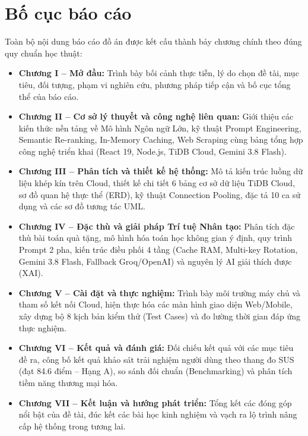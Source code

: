 
\section{Bố cục báo cáo}

Toàn bộ nội dung báo cáo đồ án được kết cấu thành bảy chương chính theo đúng quy chuẩn học thuật:

\begin{itemize}[leftmargin=1.2cm, itemsep=3pt]
    \item \textbf{Chương I -- Mở đầu:} Trình bày bối cảnh thực tiễn, lý do chọn đề tài, mục tiêu, đối tượng, phạm vi nghiên cứu, phương pháp tiếp cận và bố cục tổng thể của báo cáo.
    \item \textbf{Chương II -- Cơ sở lý thuyết và công nghệ liên quan:} Giới thiệu các kiến thức nền tảng về Mô hình Ngôn ngữ Lớn, kỹ thuật Prompt Engineering, Semantic Re-ranking, In-Memory Caching, Web Scraping cùng bảng tổng hợp công nghệ triển khai (React 19, Node.js, TiDB Cloud, Gemini 3.8 Flash).
    \item \textbf{Chương III -- Phân tích và thiết kế hệ thống:} Mô tả kiến trúc luồng dữ liệu khép kín trên Cloud, thiết kế chi tiết 6 bảng cơ sở dữ liệu TiDB Cloud, sơ đồ quan hệ thực thể (ERD), kỹ thuật Connection Pooling, đặc tả 10 ca sử dụng và các sơ đồ tương tác UML.
    \item \textbf{Chương IV -- Đặc thù và giải pháp Trí tuệ Nhân tạo:} Phân tích đặc thù bài toán quà tặng, mô hình hóa toán học không gian ý định, quy trình Prompt 2 pha, kiến trúc điều phối 4 tầng (Cache RAM, Multi-key Rotation, Gemini 3.8 Flash, Fallback Groq/OpenAI) và nguyên lý AI giải thích được (XAI).
    \item \textbf{Chương V -- Cài đặt và thực nghiệm:} Trình bày môi trường máy chủ và tham số kết nối Cloud, hiện thực hóa các màn hình giao diện Web/Mobile, xây dựng bộ 8 kịch bản kiểm thử (Test Cases) và đo lường thời gian đáp ứng thực nghiệm.
    \item \textbf{Chương VI -- Kết quả và đánh giá:} Đối chiếu kết quả với các mục tiêu đề ra, công bố kết quả khảo sát trải nghiệm người dùng theo thang đo SUS (đạt 84.6 điểm -- Hạng A), so sánh đối chuẩn (Benchmarking) và phân tích tiềm năng thương mại hóa.
    \item \textbf{Chương VII -- Kết luận và hướng phát triển:} Tổng kết các đóng góp nổi bật của đề tài, đúc kết các bài học kinh nghiệm và vạch ra lộ trình nâng cấp hệ thống trong tương lai.
\end{itemize}